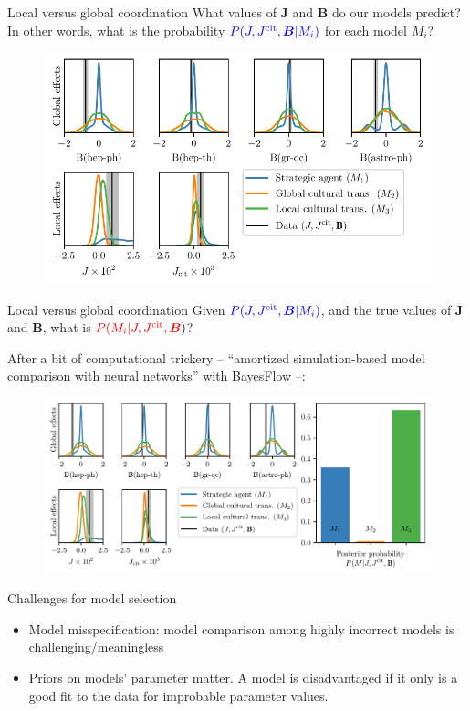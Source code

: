 \documentclass[10pt]{beamer}
\begin{document}
\begin{frame}{Local versus global coordination}
    What values of $\bm{J}$ and $\bm{B}$ do our models predict? In other words, what is the probability $\textcolor{blue}{P(J,J^\text{cit},\bm{B}|M_i)}$ for each model $M_i$?
    \begin{figure}
        \centering
        \includegraphics[width=0.9\linewidth]{draws_compact_nobars.pdf}
    \end{figure}
\end{frame}

\begin{frame}{Local versus global coordination}
    Given $\textcolor{blue}{P(J,J^\text{cit},\bm{B}|M_i)}$, and the true values of $\bm{J}$ and $\bm{B}$, what is $\textcolor{red}{P(M_i|J,J^{\text{cit}},\bm{B}})$?

    After a bit of computational trickery -- ``amortized simulation-based model comparison with neural networks'' with BayesFlow --:
    
    \begin{figure}
        \centering
        \includegraphics[width=0.9\linewidth]{draws_compact.pdf}
    \end{figure}
\end{frame}

\begin{frame}{Challenges for model selection}
    \begin{itemize}
        \item<1-> Model misspecification: model comparison among highly incorrect models is challenging/meaningless
        \item<2-> Priors on models' parameter matter. A model is disadvantaged if it only is a good fit to the data for improbable parameter values.
    \end{itemize}
\end{frame}
\end{document}
